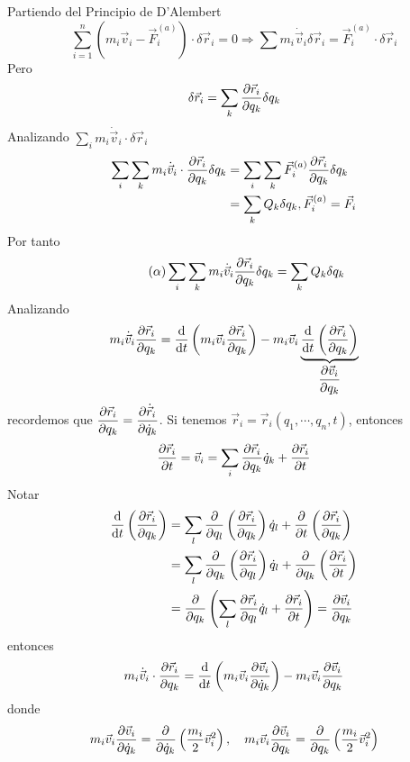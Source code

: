 \documentclass[../main]{subfiles}
\begin{document}
Partiendo del Principio de D'Alembert
\begin{equation}
    \sum_{i=1}^n (m_i \vec{v}_i-\vec{F}^{(a)}_i)\cdot \delta \vec{r}_i=0 \Rightarrow \sum m_i \dot{\vec{v}}_i \delta \vec{r}_i=\vec{F}^{(a)}_i\cdot \delta \vec{r}_i
\end{equation}
Pero 
\begin{equation}
    \delta \vec{r}_i = \sum_k \pdv{\vec{r}_i}{q_k}\delta q_k
\end{equation}
Analizando $\sum_i m_i \dot{\vec{v}}_i \cdot \delta \vec{r}_i$
\begin{equation}
    \begin{split}
        \sum_i \sum_k m_i \dot{\vec{v}}_i \cdot \pdv{\vec{r}_i}{q_k}\delta q_k &=\sum_i \sum_k \vec{F}^{(a)}_i \pdv{\vec{r}_i}{q_k}\delta q_k \\
        &=\sum_k Q_k \delta q_k, \vec{F}^{(a)}_i=\vec{F}_i
    \end{split}
\end{equation}
Por tanto 
\begin{equation}\tag{$\alpha$}
    \sum_i \sum_k m_i \dot{\vec{v}}_i \pdv{\vec{r}_i}{q_k}\delta q_k = \sum_k Q_k \delta q_k
    \label{ec:alpha}
\end{equation}
Analizando 
\begin{equation}
    m_i \dot{\vec{v}}_i \pdv{\vec{r}_i}{q_k}=\dv{}{t}\left(m_i \vec{v}_i \pdv{\vec{r}_i}{q_k}\right)-m_i\vec{v}_i \underbrace{\dv{}{t}\left(\pdv{\vec{r}_i}{q_k}\right)}_{\displaystyle \pdv{\vec{v}_i}{q_k}}
\end{equation}
recordemos que $\displaystyle \pdv{\vec{r}_i}{q_k}=\pdv{\dot{\vec{r}}_i}{\dot{q}_k}$. Si tenemos $\vec{r}_i=\vec{r}_i(q_1, \cdots, q_n, t)$, entonces
\begin{equation}
    \pdv{\vec{r}_i}{t}=\vec{v}_i=\sum_i \pdv{\vec{r}_i}{q_k}\dot{q}_k+\pdv{\vec{r}_i}{t}
\end{equation}
Notar 
\begin{equation}
    \begin{split}
        \dv{}{t}\left(\pdv{\vec{r}_i}{q_k}\right)&=\sum_l \pdv{}{q_l}\left(\pdv{\vec{r}_i}{q_k}\right)\dot{q}_l+\pdv{}{t}\left(\pdv{\vec{r}_i}{q_k}\right)\\
        &=\sum_l \pdv{}{q_k}\left(\pdv{\vec{r}_i}{q_l}\right)\dot{q}_l+\pdv{}{q_k}\left(\pdv{\vec{r}_i}{t}\right)\\
        &=\pdv{}{q_k}\left(\sum_l \pdv{\vec{r}_i}{q_l}\dot{q}_l+\pdv{\vec{r}_i}{t}\right)=\pdv{\vec{v}_i}{q_k}
    \end{split}
\end{equation}
entonces
\begin{equation}
    m_i \dot{\vec{v}}_i \cdot \pdv{\vec{r}_i}{q_k}=\dv{}{t}\left(m_i \vec{v}_i\pdv{\vec{v}_i}{\dot{q}_k}\right)-m_i \vec{v}_i\pdv{\vec{v}_i}{q_k}
\end{equation}
donde 
\begin{equation*}
    m_i \vec{v}_i\pdv{\vec{v}_i}{\dot{q}_k}=\pdv{}{\dot{q}_k}\left(\dfrac{m_i}{2}\vec{v}^2_i\right),\quad m_i \vec{v}_i\pdv{\vec{v}_i}{q_k}=\pdv{}{q_k}\left(\dfrac{m_i}{2}\vec{v}^2_i\right)
\end{equation*}
\end{document}
